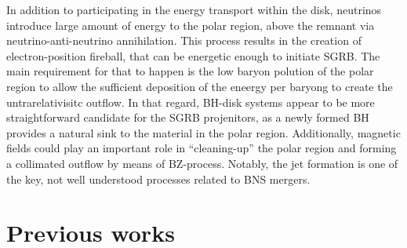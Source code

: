 In addition to participating in the energy transport within the disk, neutrinos 
introduce large amount of energy to the polar region, above the remnant via 
neutrino-anti-neutrino annihilation. This process results in the creation of 
electron-position fireball, that can be energetic enough to initiate \ac{SGRB}. 
The main requirement for that to happen is the low baryon polution of the polar 
region to allow the sufficient deposition of the eneergy per baryong to create the 
untrarelativisitc outflow. In that regard, BH-disk systems appear to be more 
straightforward candidate for the \ac{SGRB} projenitors, as a newly formed \ac{BH} 
provides a natural sink to the material in the polar region. 
Additionally, magnetic fields could play an important role in ``cleaning-up'' the 
polar region and forming a collimated outflow by means of BZ-process. 
Notably, the jet formation is one of the key, not well understood processes 
related to \ac{BNS} mergers.




\section{Previous works}




